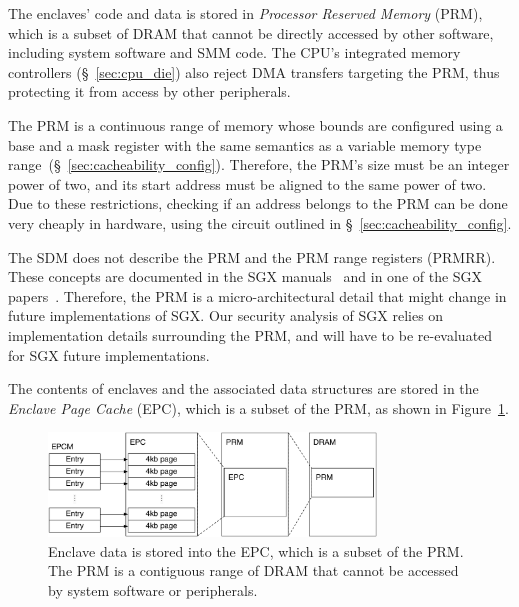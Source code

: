 \label{sec:sgx_prm}


The enclaves' code and data is stored in \textit{Processor Reserved Memory}
(PRM), which is a subset of DRAM that cannot be directly accessed by other
software, including system software and SMM code. The CPU's integrated memory
controllers (\S~\ref{sec:cpu_die}) also reject DMA transfers targeting the PRM,
thus protecting it from access by other peripherals.


The PRM is a continuous range of memory whose bounds are configured using a
base and a mask register with the same semantics as a variable memory type
range~(\S~\ref{sec:cacheability_config}). Therefore, the PRM's size must be an
integer power of two, and its start address must be aligned to the same power
of two. Due to these restrictions, checking if an address belongs to the PRM
can be done very cheaply in hardware, using the circuit outlined in
\S~\ref{sec:cacheability_config}.

The SDM does not describe the PRM and the PRM range registers (PRMRR). These
concepts are documented in the SGX
manuals~\cite{intel2013sgxmanual, intel2014sgx2manual} and in one of the SGX
papers~\cite{mckeen2013sgx}. Therefore, the PRM is a micro-architectural detail
that might change in future implementations of SGX. Our security analysis of
SGX relies on implementation details surrounding the PRM, and will have to be
re-evaluated for SGX future implementations.


\label{sec:sgx_epc}


The contents of enclaves and the associated data structures are stored in the
\textit{Enclave Page Cache} (EPC), which is a subset of the PRM, as shown in
Figure~\ref{fig:sgx_epc}.

\begin{figure}[hbt]
  \centering
  \includegraphics[width=87mm]{figures/sgx_epc.pdf}
  \caption{
    Enclave data is stored into the EPC, which is a subset of the PRM. The
    PRM is a contiguous range of DRAM that cannot be accessed by system
    software or peripherals.
  }
  \label{fig:sgx_epc}
\end{figure}

